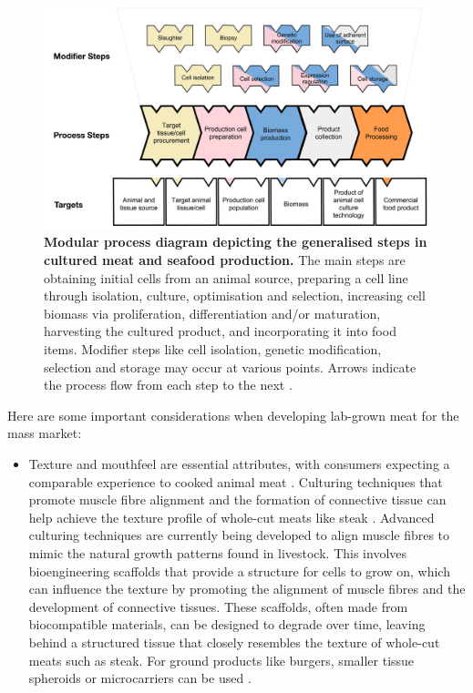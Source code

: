 \documentclass[10pt]{article}
\begin{document}
\begin{sloppypar}
  \begin{figure}[ht]
    \centering
    \includegraphics[width=\textwidth]{figures/lab-grown-meat-step.png}
    \caption[Modular process diagram depicting the generalised steps in cultured meat and seafood production.]{\textbf{Modular process diagram depicting the generalised steps in cultured meat and seafood production.} The main steps are obtaining initial cells from an animal source, preparing a cell line through isolation, culture, optimisation and selection, increasing cell biomass via proliferation, differentiation and/or maturation, harvesting the cultured product, and incorporating it into food items. Modifier steps like cell isolation, genetic modification, selection and storage may occur at various points. Arrows indicate the process flow from each step to the next \citep{ong_food_2021}.}
    \label{fig:lab-grown-meat-process}
  \end{figure}

  Here are some important considerations when developing lab-grown meat for the mass market:

  \begin{itemize}
    \item Texture and mouthfeel are essential attributes, with consumers expecting a comparable experience to cooked animal meat \citep{datar_possibilities_2010}. Culturing techniques that promote muscle fibre alignment and the formation of connective tissue can help achieve the texture profile of whole-cut meats like steak \citep{post_cultured_2012}. Advanced culturing techniques are currently being developed to align muscle fibres to mimic the natural growth patterns found in livestock. This involves bioengineering scaffolds that provide a structure for cells to grow on, which can influence the texture by promoting the alignment of muscle fibres and the development of connective tissues. These scaffolds, often made from biocompatible materials, can be designed to degrade over time, leaving behind a structured tissue that closely resembles the texture of whole-cut meats such as steak. For ground products like burgers, smaller tissue spheroids or microcarriers can be used \citep{specht_opportunities_2018}.


\end{itemize}
\end{sloppypar}
\end{document}
